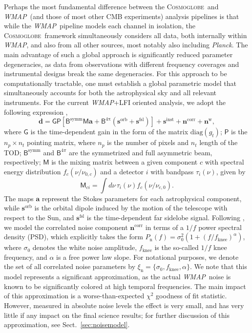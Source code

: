 \documentclass[twocolumn]{../../common/aa}
\def\WMAP{\emph{WMAP}}
\def\Planck{\emph{Planck}}
\newcommand{\cosmoglobe}{\textsc{Cosmoglobe}}
\begin{document}
Perhaps the most fundamental difference between the \cosmoglobe\ and \WMAP\ (and those of most other CMB experiments) analysis pipelines is that while the \WMAP\ pipeline models each channel in isolation, the \cosmoglobe\ framework simultaneously considers all data, both internally within \WMAP, and also from all other sources, most notably also including \Planck. The main advantage of such a global approach is significantly reduced parameter degeneracies, as data from observations with different frequency coverages and instrumental designs break the same degeneracies. For this approach to be computationally tractable, one must establish a global parametric model that simultaneously accounts for both the astrophysical sky and all relevant instruments. For the current \WMAP+LFI oriented analysis, we adopt the following expression \citep{bp01},
\begin{equation}
	\label{eq:model}
	\boldsymbol d =\mathsf G\mathsf P[\mathsf B^\mathrm{symm}\mathsf M\boldsymbol a+\mathsf B^\mathrm{4\pi}(\boldsymbol s^\mathrm{orb}
	+\boldsymbol s^\mathrm{fsl})] + \boldsymbol s^\mathrm{inst}+ \boldsymbol n^\mathrm{corr}+\boldsymbol n^\mathrm w,
\end{equation}
where $\mathsf G$ is the time-dependent gain in the form of the matrix $\mathrm{diag}(g_t)$; $\mathsf P$ is the $n_p\times n_t$ pointing matrix, where $n_p$ is the number of pixels and $n_t$ length of the TOD;
$\mathsf B^\mathrm{symm}$ and $\mathsf B^{4\pi}$ are the symmetrized and full asymmetric beam, respectively; $\mathsf M$ is the mixing matrix between a given component $c$ with spectral energy distribution $f_c(\nu/\nu_{0,c})$ and a detector $i$ with bandpass $\tau_i(\nu)$, given by
\begin{equation}
	\mathsf M_{ci}=\int d\nu\,\tau_i(\nu)f_c(\nu/\nu_{c,0}).
\end{equation}
The maps $\boldsymbol a$ represent the Stokes parameters for each astrophysical component, while $\boldsymbol s^\mathrm{orb}$ is the orbital dipole induced by the motion of the telescope with respect to the Sun, and $\boldsymbol s^\mathrm{fsl}$ is the time-dependent far sidelobe signal. Following \citet{bp06}, we model the correlated noise component $\boldsymbol n^\mathrm{corr}$ in terms of a $1/f$ power spectral density (PSD), which explicitly takes the form $P_\mathrm{n}(f) = \sigma^2_0 (1 + (f/f_\mathrm{knee})^\alpha)$, where $\sigma_0$ denotes the white noise amplitude, $f_\mathrm{knee}$ is the so-called $1/f$ knee frequency, and $\alpha$ is a free power law slope. For notational purposes, we denote the set of all correlated noise parameters by $\xi_{\mathrm{n}} = \{\sigma_0, f_{\mathrm{knee}}, \alpha\}$. We note that this model represents a significant approximation, as the actual \WMAP\ noise is known to be significantly colored  at high temporal frequencies. The main impact of this approximation is a worse-than-expected $\chi^2$ goodness of fit statistic. However, measured in absolute noise levels the effect is very small, and has very little if any impact on the final science results; for further discussion of this approximation, see Sect.~\ref{sec:noisemodel}. 
\end{document}
